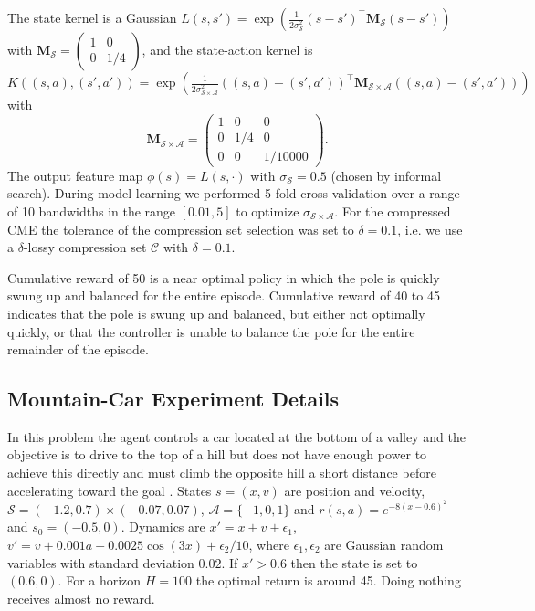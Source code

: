 \documentclass[letterpaper]{article}
\newcommand{\SinghEligibility}{DBLP:journals/ml/SinghS96}
\newcommand{\cC}{{\mathcal C}}
\newcommand{\cA}{{\mathcal A}}
\newcommand{\cS}{{\mathcal S}}
\newcommand{\bM}{{\bm M}}
\begin{document}
The state kernel is a Gaussian $L(s,s') = \exp\left({\frac{1}{2\sigma_{\cS}^2}(s - s')^\top \bM_\cS (s - s')}\right)$ with $\bM_\cS =\left( \begin{array}{cc}
1 & 0 \\
0 & 1/4 \end{array} \right)$, and the state-action kernel is  $K((s,a),(s',a')) = \exp\left({\frac{1}{2\sigma_{\cS\times\cA}^2}((s,a) - (s',a'))^\top \bM_{\cS\times\cA} ((s,a) - (s',a'))}\right)$ with
$$\bM_{\cS\times\cA} =\left( \begin{array}{ccc}
1 & 0 & 0\\
0 & 1/4 & 0\\
0 & 0 & 1/10000 \end{array} \right).$$ The output feature map $\phi(s) = L(s,\cdot)$ with $\sigma_{\cS} = 0.5$ (chosen by informal search). During model learning we performed 5-fold cross validation over a range of 10 bandwidths in the range $[0.01,5]$ to optimize $\sigma_{\cS\times\cA}$. For the compressed CME the tolerance of the compression set selection was set to $\delta = 0.1$, i.e. we use a $\delta$-lossy compression set $\cC$ with $\delta=0.1$.

Cumulative reward of 50 is a near optimal policy in which the pole is quickly swung up and balanced for the entire episode. Cumulative reward of 40 to 45 indicates that the pole is swung up and balanced, but either not optimally quickly, or that the controller is unable to balance the pole for the entire remainder of the episode. 

\subsection{Mountain-Car Experiment Details}

In this problem the agent controls a car located at the bottom of a valley and the objective is to drive to the top of a hill but does not have enough power to achieve this directly and must climb the opposite hill a short distance before accelerating toward the goal \cite[see e.g.][]{\SinghEligibility}. States $s =(x,v)$ are position and velocity, $\cS=(-1.2,0.7)\times(-0.07,0.07)$, $\cA=\{-1,0,1\}$ and $r(s,a) = e^{-8(x-0.6)^2} $ and $s_0 = (-0.5,0)$. Dynamics are $x' = x+v+\epsilon_1$, $v' = v + 0.001a -0.0025 \cos(3 x) + \epsilon_2/10$, where $\epsilon_1, \epsilon_2$ are Gaussian random variables with standard deviation $0.02$. If $x'>0.6$ then the state is set to $(0.6,0)$. For a horizon $H=100$ the optimal return is around 45. Doing nothing receives almost no reward. 
\end{document}
